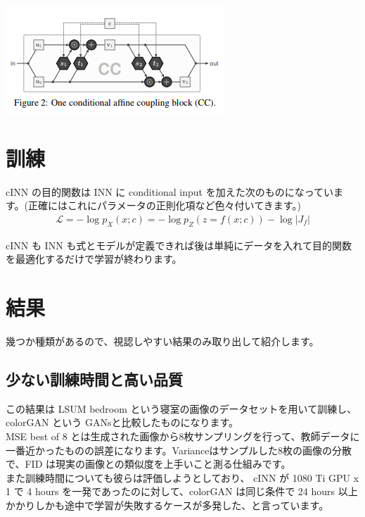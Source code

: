 \documentclass[a4paper, dvipdfmx, 10pt]{article}
\begin{document}
\begin{center}
\includegraphics[width=.9\linewidth]{./img/cac.png}
\end{center}

\section{訓練}
\label{sec:org1b6b6f3}
cINN の目的関数は INN に conditional input を加えた次のものになっています。(正確にはこれにパラメータの正則化項など色々付いてきます。)\\

\begin{eqnarray}
\mathcal{L} = - \log{p_X(x; c)} = - \log {p_Z(z = f(x; c))} - \log{|J_f|}
\end{eqnarray}

cINN も INN も式とモデルが定義できれば後は単純にデータを入れて目的関数を最適化するだけで学習が終わります。\\
\section{結果}
\label{sec:org3624011}
幾つか種類があるので、視認しやすい結果のみ取り出して紹介します。\\

\subsection{少ない訓練時間と高い品質}
\label{sec:orgbb87488}
この結果は LSUM bedroom という寝室の画像のデータセットを用いて訓練し、colorGAN という GANsと比較したものになります。\\
MSE best of 8 とは生成された画像から8枚サンプリングを行って、教師データに一番近かったものの誤差になります。Varianceはサンプルした8枚の画像の分散で、FID は現実の画像との類似度を上手いこと測る仕組みです。\\

また訓練時間についても彼らは評価しようとしており、 cINN が 1080 Ti GPU x 1 で 4 hours を一発であったのに対して、colorGAN は同じ条件で 24 hours 以上かかりしかも途中で学習が失敗するケースが多発した、と言っています。\\
\end{document}

